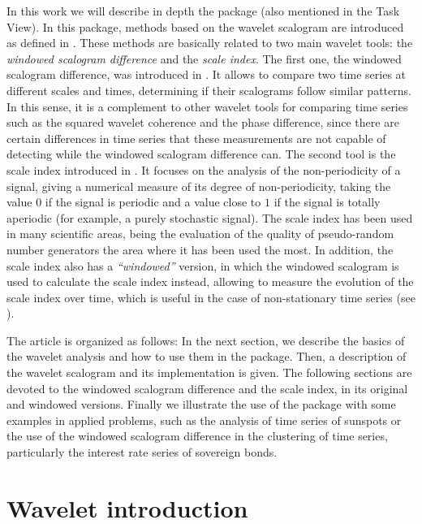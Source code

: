 In this work we will describe in depth the   package \citep{wavScalogram} (also mentioned in the  Task View). In this package, methods based on the wavelet scalogram are introduced as defined in \citet{ben10,bol17,bol20}. These methods are basically related to two main wavelet tools: the \textit{windowed scalogram difference} and the \textit{scale index}. The first one, the windowed scalogram difference, was introduced in \citet{bol17}. It allows to compare two time series at different scales and times, determining if their scalograms follow similar patterns. In this sense, it is a complement to other wavelet tools for comparing time series such as the squared wavelet coherence and the phase difference, since there are certain  differences in time series that these measurements are not capable of detecting while the windowed scalogram difference can. The second tool is the scale index introduced in \citet{ben10}. It focuses on the analysis of the non-periodicity of a signal, giving a numerical measure of its degree of non-periodicity, taking the value $0$ if the signal is periodic and a value close to $1$ if the signal is totally aperiodic (for example, a purely stochastic signal). The scale index has been used in many scientific areas, being the evaluation of the quality of pseudo-random number generators the area where it has been used the most. In addition, the scale index also has a \textit{``windowed''} version, in which the windowed scalogram is used to calculate the scale index instead, allowing to measure the evolution of the scale index over time, which is useful in the case of non-stationary time series (see \citet{bol20}).

The article is organized as follows: In the next section, we describe the basics of the wavelet analysis and how to use them in the  package. Then,  a description of the wavelet scalogram and its implementation is given. The following sections are devoted to the windowed scalogram difference and the scale index, in its original and windowed versions. Finally we illustrate the use of the package with some examples in applied problems, such as the analysis of time series of sunspots or the use of the windowed scalogram difference in the clustering of time series, particularly the interest rate series of sovereign bonds.

\section{Wavelet introduction}
\label{sec2}

